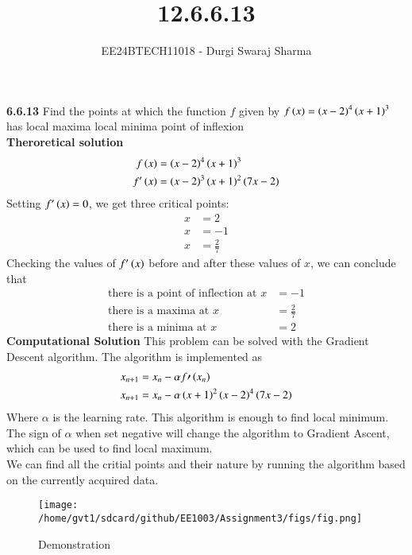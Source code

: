 \documentclass[journal]{IEEEtran}
\begin{document}

\vspace{3cm}

\title{12.6.6.13}
\author{EE24BTECH11018 - Durgi Swaraj Sharma}

{\let\newpage\relax\maketitle}
\renewcommand{\thefigure}{\theenumi}
\renewcommand{\thetable}{\theenumi}
\setlength{\intextsep}{10pt}
\renewcommand{\thetable}{\theenumi}

\textbf{6.6.13} Find the points at which the function $f$ given by $f\left(x\right) = \left(x-2\right)^4 \left(x+1\right)^3$ has  local maxima  local minima  point of inflexion\\
\textbf{Theroretical solution}
\begin{align}
	f\left(x\right) &= \left(x-2\right)^4\left(x+1\right)^3\\
	f^{\prime}\left(x\right) &= \left(x-2\right)^3\left(x+1\right)^2\left(7x-2\right)
\end{align}
Setting $f^{\prime}\left(x\right) = 0$, we get three critical points:
\begin{align}
	x &= 2\\ x &= -1\\ x &= \frac{2}{7}
\end{align}
Checking the values of $f^{\prime}\left(x\right)$ before and after these values of $x$, we can conclude that
\begin{align*}
	\text{there is a point of inflection at } x&=-1\\
	\text{there is a maxima at } x&=\frac{2}{7}\\
	\text{there is a minima at } x&=2
\end{align*}
\textbf{Computational Solution}
This problem can be solved with the Gradient Descent algorithm.
The algorithm is implemented as
\begin{align}
	x_{n+1}&=x_n-\alpha f{\prime}\left(x_n\right)\\
	x_{n+1}&=x_n-\alpha \left(x+1\right)^2\left(x-2\right)^4\left(7x-2\right)
\end{align}
Where $\alpha$ is the learning rate. This algorithm is enough to find local minimum. The sign of $\alpha$ when set negative will change the algorithm to Gradient Ascent, which can be used to find local maximum.\\
We can find all the critial points and their nature by running the algorithm based on the currently acquired data.
\begin{figure}
	\centering
	\texttt{[image: /home/gvt1/sdcard/github/EE1003/Assignment3/figs/fig.png]}
	\caption{Demonstration}
\end{figure}
\end{document}

